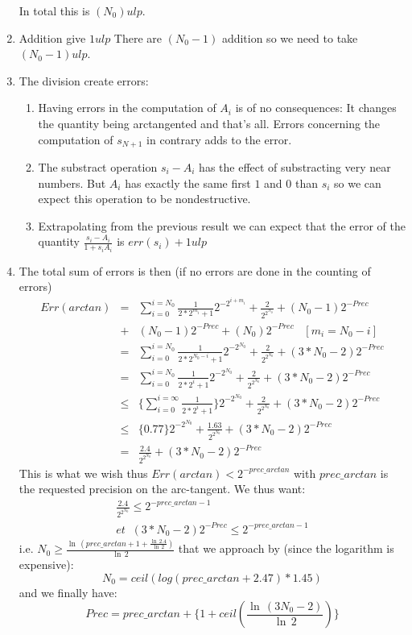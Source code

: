 \documentclass[12pt]{amsart}
\begin{document}
\begin{enumerate}
In total this is $(N_0) ulp$.
\item Addition give $1 ulp$ There are $(N_0-1)$ addition so we need to take $(N_0 -1) ulp$.
\item The division create errors:
\begin{enumerate}
\item Having errors in the computation of $A_i$ is of no consequences: It changes the quantity being arctangented and that's all. Errors concerning the computation of $s_{N+1}$ in contrary adds to the error.
\item The substract operation $s_i-A_i$ has the effect of substracting very near numbers. But $A_i$ has exactly the same first $1$ and $0$ than $s_i$ so we can expect this operation to be nondestructive.
\item Extrapolating from the previous result we can expect that the error of the quantity $\frac{s_i-A_i}{1+s_iA_i}$ is $err(s_i)+1 ulp$
\end{enumerate}
\item The total sum of errors is then (if no errors are done in the counting of errors)
\begin{equation*}
\begin{array}{rcl}
Err(arctan)
&=&\sum_{i=0}^{i=N_0}\frac{1}{2*2^{m_i}+1}2^{-2^{i+m_i}}+\frac{2}{2^{2^{N_0}}}+(N_0-1)2^{-Prec}\\
&+&(N_0 -1)2^{-Prec}+(N_0)2^{-Prec}\;\;\;[m_i=N_0-i]\\
&=&\sum_{i=0}^{i=N_0}\frac{1}{2*2^{N_0-i}+1}2^{-2^{N_0}}+\frac{2}{2^{2^{N_0}}}+(3*N_0-2)2^{-Prec}\\
&=&\sum_{i=0}^{i=N_0}\frac{1}{2*2^{i}+1}2^{-2^{N_0}}+\frac{2}{2^{2^{N_0}}}+(3*N_0-2)2^{-Prec}\\
&\leq &\{\sum_{i=0}^{i=\infty}\frac{1}{2*2^{i}+1}\}2^{-2^{N_0}}+\frac{2}{2^{2^{N_0}}}+(3*N_0-2)2^{-Prec}\\
&\leq&\{0.77\}2^{-2^{N_0}}+\frac{1.63}{2^{2^{N_0}}}+(3*N_0-2)2^{-Prec}\\
&=&\frac{2.4}{2^{2^{N_0}}}+(3*N_0-2)2^{-Prec}
\end{array}
\end{equation*}
This is what we wish thus $Err(arctan)< 2^{-prec\_arctan}$ with $prec\_arctan$
is the requested precision on the arc-tangent.
We thus want:
\begin{equation*}
\begin{array}{c}
\frac{2.4}{2^{2^{N_0}}}\leq 2^{-prec\_arctan-1}\\
et\;\;(3*N_0-2)2^{-Prec}\leq 2^{-prec\_arctan-1}
\end{array}
\end{equation*}
i.e. $N_0\geq \frac{\ln\,(prec\_arctan+1+\frac{\ln\,2.4}{\ln\,2})}{\ln\,2}$
that we approach by (since the logarithm is expensive):
\begin{equation*}
N_0=ceil(log(prec\_arctan+2.47)*1.45)
\end{equation*}
and we finally have:
\begin{equation*}
Prec=prec\_arctan+\{1+ceil(\frac{\ln\,(3N_0-2)}{\ln\,2})\}
\end{equation*}
\end{enumerate}
\end{document}

